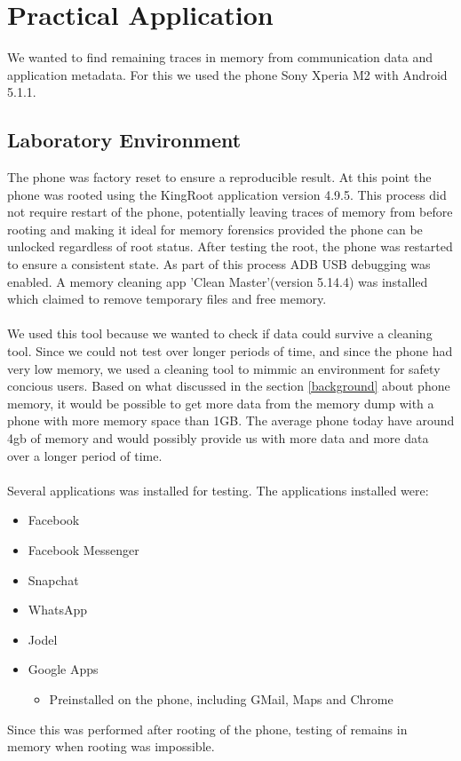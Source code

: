 \section{Practical Application}
We wanted to find remaining traces in memory from communication data and application metadata. For this we used the phone Sony Xperia M2 with Android 5.1.1.

\subsection{Laboratory Environment}
The phone was factory reset to ensure a reproducible result. At this point the phone was rooted %
using the KingRoot application version 4.9.5. This process did not require restart of the phone, potentially leaving traces of memory from before rooting and making it ideal for memory forensics provided the phone can be unlocked regardless of root status. After testing the root, the phone was restarted to ensure a consistent state. As part of this process ADB USB debugging was enabled. A memory cleaning app 'Clean Master'(version 5.14.4) was installed which claimed to remove temporary files and free memory.\\\\ %
We used this tool because we wanted to check if data could survive a cleaning tool. Since we could not test over longer periods of time, and since the phone had very low memory, we used a cleaning tool to mimmic an environment for safety concious users. Based on what discussed in the section \ref{background} about phone memory, it would be possible to get more data from the memory dump with a phone with more memory space than 1GB. The average phone today have around 4gb of memory and would possibly provide us with more data and more data over a longer period of time.\\\\Several applications was installed for testing. The applications installed were:
\begin{description}
\begin{itemize}
\item{Facebook}
\item{Facebook Messenger}
\item{Snapchat}
\item{WhatsApp}
\item{Jodel}
\item{Google Apps}
\begin{itemize}
\item{Preinstalled on the phone, including GMail, Maps and Chrome}
\end{itemize}
\end{itemize}
\end{description}
Since this was performed after rooting of the phone, testing of remains in memory when rooting was impossible.

